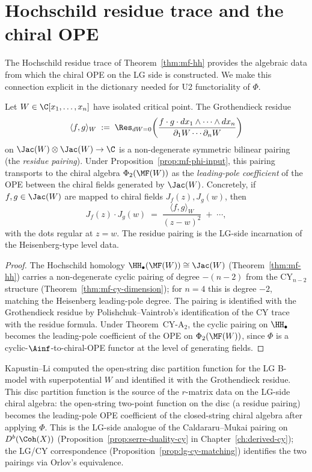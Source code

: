 \section{Hochschild residue trace and the chiral OPE}
\label{sec:hochschild-residue-ope}

The Hochschild residue trace of Theorem~\ref{thm:mf-hh} provides the algebraic data from which the chiral OPE on the LG side is constructed. We make this connection explicit in the dictionary needed for U2 functoriality of $\Phi$.

\begin{proposition}
\label{prop:residue-rmatrix-data}
Let $W \in \C[x_1, \ldots, x_n]$ have isolated critical point. The Grothendieck residue
\[
 \langle f, g \rangle_W \;:=\; \Res_{dW = 0}\!\left( \frac{f \cdot g \cdot dx_1 \wedge \cdots \wedge dx_n}{\partial_1 W \cdots \partial_n W} \right)
\]
on $\Jac(W) \otimes \Jac(W) \to \C$ is a non-degenerate symmetric bilinear pairing (the \emph{residue pairing}). Under Proposition~\ref{prop:mf-phi-input}, this pairing transports to the chiral algebra $\Phi_2(\MF(W))$ as the \emph{leading-pole coefficient} of the OPE between the chiral fields generated by $\Jac(W)$. Concretely, if $f, g \in \Jac(W)$ are mapped to chiral fields $J_f(z), J_g(w)$, then
\[
 J_f(z) \cdot J_g(w) \;=\; \frac{\langle f, g \rangle_W}{(z - w)^{2}} \;+\; \cdots,
\]
with the dots regular at $z = w$. The residue pairing is the LG-side incarnation of the Heisenberg-type level data.
\end{proposition}

\begin{proof}
The Hochschild homology $\HH_\bullet(\MF(W)) \cong \Jac(W)$ (Theorem~\ref{thm:mf-hh}) carries a non-degenerate cyclic pairing of degree $-(n - 2)$ from the CY$_{n-2}$ structure (Theorem~\ref{thm:mf-cy-dimension}); for $n = 4$ this is degree $-2$, matching the Heisenberg leading-pole degree. The pairing is identified with the Grothendieck residue by Polishchuk--Vaintrob's identification of the CY trace with the residue formula. Under Theorem~CY-A$_2$, the cyclic pairing on $\HH_\bullet$ becomes the leading-pole coefficient of the OPE on $\Phi_2(\MF(W))$, since $\Phi$ is a cyclic-$\Ainf$-to-chiral-OPE functor at the level of generating fields.
\end{proof}

\begin{remark}
\label{rem:kapustin-li-rmatrix}
Kapustin--Li \cite{KapustinLi2003} computed the open-string disc partition function for the LG B-model with superpotential $W$ and identified it with the Grothendieck residue. This disc partition function is the source of the $r$-matrix data on the LG-side chiral algebra: the open-string two-point function on the disc (a residue pairing) becomes the leading-pole OPE coefficient of the closed-string chiral algebra after applying $\Phi$. This is the LG-side analogue of the Caldararu--Mukai pairing on $D^b(\Coh(X))$ (Proposition~\ref{prop:serre-duality-cy} in Chapter~\ref{ch:derived-cy}); the LG/CY correspondence (Proposition~\ref{prop:lg-cy-matching}) identifies the two pairings via Orlov's equivalence.
\end{remark}

